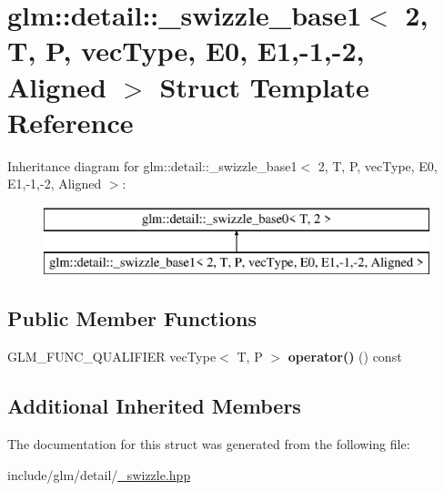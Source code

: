 \hypertarget{structglm_1_1detail_1_1__swizzle__base1_3_012_00_01T_00_01P_00_01vecType_00_01E0_00_01E1_00-1_00-2_00_01Aligned_01_4}{}\section{glm\+:\+:detail\+:\+:\+\_\+swizzle\+\_\+base1$<$ 2, T, P, vec\+Type, E0, E1,-\/1,-\/2, Aligned $>$ Struct Template Reference}
\label{structglm_1_1detail_1_1__swizzle__base1_3_012_00_01T_00_01P_00_01vecType_00_01E0_00_01E1_00-1_00-2_00_01Aligned_01_4}
Inheritance diagram for glm\+:\+:detail\+:\+:\+\_\+swizzle\+\_\+base1$<$ 2, T, P, vec\+Type, E0, E1,-\/1,-\/2, Aligned $>$\+:\begin{figure}[H]
\begin{center}
\leavevmode
\includegraphics[height=2.000000cm]{structglm_1_1detail_1_1__swizzle__base1_3_012_00_01T_00_01P_00_01vecType_00_01E0_00_01E1_00-1_00-2_00_01Aligned_01_4}
\end{center}
\end{figure}
\subsection*{Public Member Functions}
\begin{DoxyCompactItemize}
\item 
\mbox{\label{structglm_1_1detail_1_1__swizzle__base1_3_012_00_01T_00_01P_00_01vecType_00_01E0_00_01E1_00-1_00-2_00_01Aligned_01_4_a08b7cb3886356b94ac68beb83e03564c}} 
G\+L\+M\+\_\+\+F\+U\+N\+C\+\_\+\+Q\+U\+A\+L\+I\+F\+I\+ER vec\+Type$<$ T, P $>$ {\bfseries operator()} () const
\end{DoxyCompactItemize}
\subsection*{Additional Inherited Members}


The documentation for this struct was generated from the following file\+:\begin{DoxyCompactItemize}
\item 
include/glm/detail/\hyperlink{__swizzle_8hpp}{\+\_\+swizzle.\+hpp}\end{DoxyCompactItemize}
